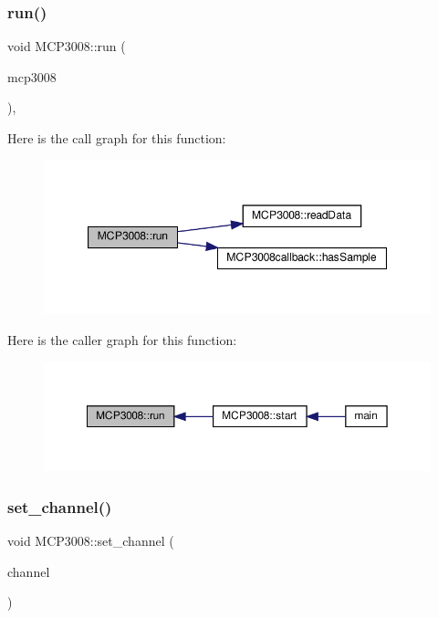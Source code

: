 \subsubsection{\texorpdfstring{run()}{run()}}
{\footnotesize\ttfamily void M\+C\+P3008\+::run (\begin{DoxyParamCaption}\item[{\hyperlink{classMCP3008}{M\+C\+P3008} $\ast$}]{mcp3008 }\end{DoxyParamCaption})\hspace{0.3cm}{\ttfamily [static]}, {\ttfamily [private]}}

Here is the call graph for this function\+:
\nopagebreak
\begin{figure}[H]
\begin{center}
\leavevmode
\includegraphics[width=347pt]{classMCP3008_a8e243711492e50dd4327050ffae8851d_cgraph}
\end{center}
\end{figure}
Here is the caller graph for this function\+:
\nopagebreak
\begin{figure}[H]
\begin{center}
\leavevmode
\includegraphics[width=350pt]{classMCP3008_a8e243711492e50dd4327050ffae8851d_icgraph}
\end{center}
\end{figure}
\mbox{\label{classMCP3008_ad1893b9dd4dbbc2efbb57843871596fc}} 
\subsubsection{\texorpdfstring{set\+\_\+channel()}{set\_channel()}}
{\footnotesize\ttfamily void M\+C\+P3008\+::set\+\_\+channel (\begin{DoxyParamCaption}\item[{uint8\+\_\+t}]{channel }\end{DoxyParamCaption})}

